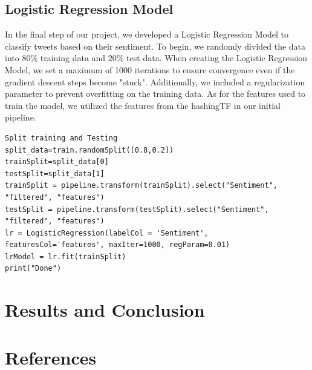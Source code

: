 \documentclass[11pt,a4paper]{article}
\begin{document}
\subsection{Logistic Regression Model}
In the final step of our project, we developed a Logistic Regression Model to classify tweets based on their sentiment.
To begin, we randomly divided the data into 80\% training data and 20\% test data. When creating the Logistic Regression Model, we set a maximum of 1000 iterations to ensure convergence even if the gradient descent steps become "stuck". Additionally, we included a regularization parameter to prevent overfitting on the training data.
As for the features used to train the model, we utilized the features from the hashingTF in our initial pipeline.
\newpage
\begin{lstlisting}
Split training and Testing
split_data=train.randomSplit([0.8,0.2])
trainSplit=split_data[0]
testSplit=split_data[1]
trainSplit = pipeline.transform(trainSplit).select("Sentiment", "filtered", "features")
testSplit = pipeline.transform(testSplit).select("Sentiment", "filtered", "features")
lr = LogisticRegression(labelCol = 'Sentiment', featuresCol='features', maxIter=1000, regParam=0.01)
lrModel = lr.fit(trainSplit)
print("Done")
\end{lstlisting}

\section{Results and Conclusion}

\section{References}
\end{document}

